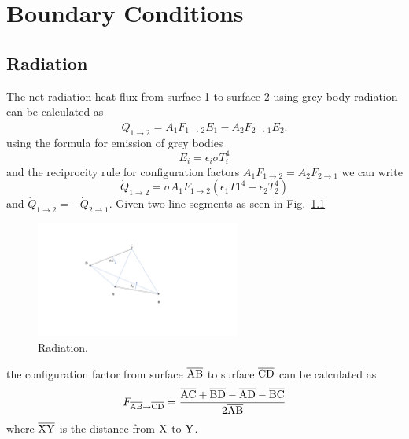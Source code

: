 \chapter{Boundary Conditions}

\section{Radiation}
The net radiation heat flux from surface 1 to surface 2 using grey body radiation can be calculated as 
\begin{equation}
	\dot{Q}_{1 \rightarrow 2} = A_1 F_{1 \rightarrow 2} E_1 -  A_2 F_{2 \rightarrow 1} E_2.
\end{equation}
using the formula for emission of grey bodies
\begin{equation}
	E_i = \epsilon_i \sigma T_i^4 
\end{equation}
and the reciprocity rule for configuration factors $A_1 F_{1 \rightarrow 2} = A_2 F_{2 \rightarrow 1}$ we can write
\begin{equation}
	\dot{Q}_{1 \rightarrow 2} = \sigma A_1 F_{1 \rightarrow 2} \left(\epsilon_1 T1^4 - \epsilon_2 T_2^4\right)
\end{equation}
and $\dot{Q}_{1 \rightarrow 2} = -\dot{Q}_{2 \rightarrow 1}$.
Given two line segments as seen in Fig.~\ref{fig:radiation}
\begin{figure}[H]
	\centering
	\includegraphics[trim= 8cm 5cm 13cm 3.5cm ,clip,width=0.6\textwidth]{figures/radiation.png}
	\caption{Radiation.}
	\label{fig:radiation}
\end{figure}
the configuration factor from surface $\overline{\mathrm{AB}}$ to surface $\overline{\mathrm{CD}}$ can be calculated as
\begin{equation}
	F_{\overline{\mathrm{AB}} \rightarrow \overline{\mathrm{CD}}} = \frac{\overline{\mathrm{AC}} + \overline{\mathrm{BD}} - \overline{\mathrm{AD}} - \overline{\mathrm{BC}}}{2 \overline{\mathrm{AB}}}
\end{equation}
where $\overline{\mathrm{XY}}$ is the distance from $\mathrm{X}$ to $\mathrm{Y}$.

